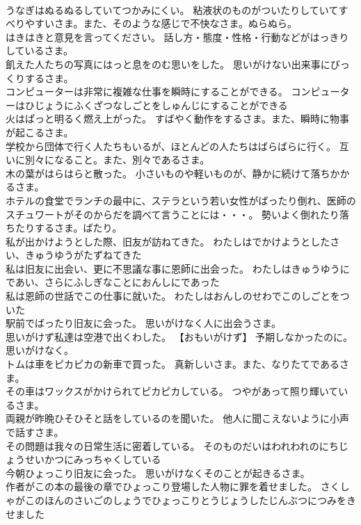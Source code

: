 \documentclass[8pt]{extreport}
\begin{document}
\begin{CJK}{UTF8}{min}
\\	うなぎはぬるぬるしていてつかみにくい。	粘液状のものがついたりしていてすべりやすいさま。また、そのような感じで不快なさま。ぬらぬら。
\\	はきはきと意見を言ってください。	話し方・態度・性格・行動などがはっきりしているさま。
\\	飢えた人たちの写真にはっと息をのむ思いをした。	思いがけない出来事にびっくりするさま。
\\	コンピューターは非常に複雑な仕事を瞬時にすることができる。	コンピューターはひじょうにふくざつなしごとをしゅんじにすることができる 
\\	火はぱっと明るく燃え上がった。	すばやく動作をするさま。また、瞬時に物事が起こるさま。
\\	学校から団体で行く人たちもいるが、ほとんどの人たちはばらばらに行く。	互いに別々になること。また、別々であるさま。
\\	木の葉がはらはらと散った。	小さいものや軽いものが、静かに続けて落ちかかるさま。
\\	ホテルの食堂でランチの最中に、ステラという若い女性がばったり倒れ、医師のスチュワートがそのからだを調べて言うことには・・・。	勢いよく倒れたり落ちたりするさま。ばたり。
\\	私が出かけようとした際、旧友が訪ねてきた。	わたしはでかけようとしたさい、きゅうゆうがたずねてきた 
\\	私は旧友に出会い、更に不思議な事に恩師に出会った。	わたしはきゅうゆうにであい、さらにふしぎなことにおんしにであった 
\\	私は恩師の世話でこの仕事に就いた。	わたしはおんしのせわでこのしごとをついた 
\\	駅前でばったり旧友に会った。	思いがけなく人に出会うさま。
\\	思いがけず私達は空港で出くわした。	【おもいがけず】 予期しなかったのに。思いがけなく。
\\	トムは車をピカピカの新車で買った。	真新しいさま。また、なりたてであるさま。
\\	その車はワックスがかけられてピカピカしている。	つやがあって照り輝いているさま。
\\	両親が昨晩ひそひそと話をしているのを聞いた。	他人に聞こえないように小声で話すさま。
\\	その問題は我々の日常生活に密着している。	そのものだいはわれわれのにちじょうせいかつにみっちゃくしている 
\\	今朝ひょっこり旧友に会った。	思いがけなくそのことが起きるさま。
\\	作者がこの本の最後の章でひょっこり登場した人物に罪を着せました。	さくしゃがこのほんのさいごのしょうでひょっこりとうじょうしたじんぶつにつみをきせました 

\end{CJK}
\end{document}
